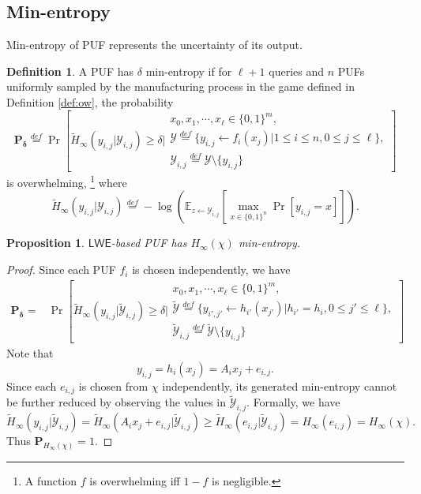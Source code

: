 \documentclass[12pt]{article}
\newcommand{\eqdef}{\stackrel{def}{=}}
\newcommand{\bits}{\{0,1\}}
\newcommand{\Ex}{\mathbb{E}}
\newcommand{\LWE}{\mathsf{LWE}}
\newtheorem{proposition}[theorem]{Proposition}
\theoremstyle{definition}
\newtheorem{definition}[theorem]{Definition}
\begin{document}
\subsection{Min-entropy}
Min-entropy of PUF represents the uncertainty of its output.
\begin{definition}
A PUF has $\delta$ min-entropy if for $\ell+1$ queries and $n$ PUFs uniformly sampled by the manufacturing process in the game defined in Definition \ref{def:ow}, the probability
$$\mathbf{P_\delta} \eqdef
\Pr \left[\tilde{H}_{\infty}(y_{i,j} | \mathcal{Y}_{i,j})\geq \delta \bigg| 
\begin{array}{c}
x_0, x_1, \cdots, x_\ell \in \bits^m, \\
\mathcal{Y} \eqdef \{y_{i,j} \gets f_i(x_j) | 1\leq i \leq n, 0\leq j \leq \ell \}, \\
\mathcal{Y}_{i,j} \eqdef \mathcal{Y} \setminus \{y_{i,j}\}
\end{array}\right]$$
is overwhelming, \footnote{A function $f$ is overwhelming iff $1-f$ is negligible.} where 
$$\tilde{H}_{\infty}(y_{i,j} | \mathcal{Y}_{i,j}) \eqdef -\log \left( \Ex_{z \gets \mathcal{Y}_{i,j}} \left[\max_{x\in\bits^n}\Pr[y_{i,j} = x] \right]\right ).$$
\end{definition}

\begin{proposition}
$\LWE$-based PUF has $H_{\infty}(\chi)$ min-entropy.
\end{proposition}
\begin{proof}
Since each PUF $f_i$ is chosen independently, we have
$$\begin{aligned}
\mathbf{P_\delta} 
=& \Pr \left[\tilde{H}_{\infty}(y_{i,j} | \widetilde{\mathcal{Y}}_{i,j})\geq \delta \bigg| 
\begin{array}{c}
x_0, x_1, \cdots, x_\ell \in \bits^m, \\
\widetilde{\mathcal{Y}} \eqdef \{y_{i',j'} \gets h_{i'}(x_{j'}) | h_{i'} = h_i, 0\leq j' \leq \ell \}, \\
\widetilde{\mathcal{Y}}_{i,j} \eqdef \widetilde{\mathcal{Y}} \setminus \{y_{i,j}\}
\end{array}\right]
\end{aligned}$$
Note that 
$$y_{i,j} = h_i(x_j) = A_ix_j + e_{i,j}.$$
Since each $e_{i,j}$ is chosen from $\chi$ independently, its generated min-entropy cannot be further reduced by observing the values in $\widetilde{\mathcal{Y}}_{i,j}$. Formally, we have
$$\tilde{H}_{\infty}(y_{i,j} | \widetilde{\mathcal{Y}}_{i,j}) 
=\tilde{H}_{\infty}(A_ix_j + e_{i,j} | \widetilde{\mathcal{Y}}_{i,j}) 
\geq \tilde{H}_{\infty}(e_{i,j} | \widetilde{\mathcal{Y}}_{i,j}) 
= H_{\infty}(e_{i,j}) = H_{\infty}(\chi). $$
Thus $\mathbf{P}_{H_{\infty}(\chi)} = 1$.
\end{proof}
\end{document}
